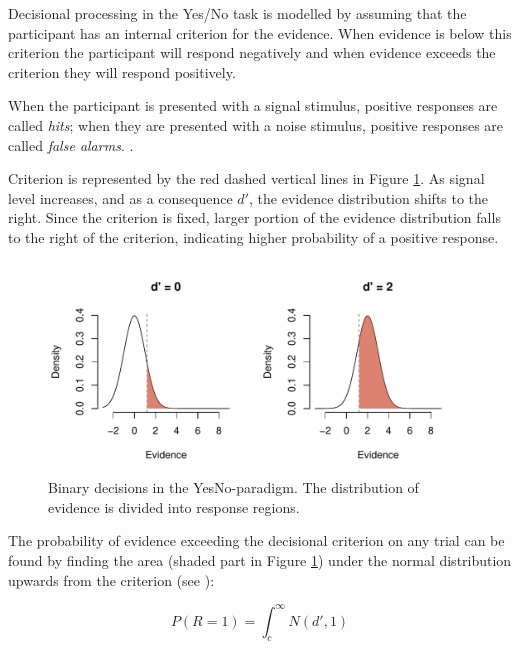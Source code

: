 \documentclass{article}\usepackage{knitr}
\begin{document}
Decisional processing in the Yes/No task is modelled by assuming that the participant has an internal criterion for the evidence. When evidence is below this criterion the participant will respond negatively and when evidence exceeds the criterion they will respond  positively.

When the participant is presented with a signal stimulus, positive responses are called \textit{hits}; when they  are presented with a noise stimulus, positive responses are called \textit{false alarms}. \citep{wickens2002, kingdomprins2010}. 

Criterion is represented by the red dashed vertical lines in Figure \ref{fig:yesno}. As signal level increases, and as a consequence $d'$, the evidence distribution shifts to the right. Since the criterion is fixed, larger portion of the evidence distribution falls to the right of the criterion, indicating higher probability of a positive response.

\begin{figure}[!htb]
\centering
\begin{knitrout}
\color{fgcolor}
\includegraphics[width=\maxwidth]{figure/unnamed-chunk-4-1} 

\end{knitrout}
\caption{Binary decisions in the YesNo-paradigm. The distribution of evidence is divided into response regions.}
\label{fig:yesno}
\end{figure}

The probability of evidence exceeding the decisional criterion on any trial can be found by finding the area (shaded part in Figure \ref{fig:yesno}) under the normal distribution upwards from the criterion (see \citet{wickens2002, kingdomprins2010}):

\begin{equation}
\label{eq:SDTintegral}
P(R = 1) = \int_{c}^{\infty} N(d', 1)
\end{equation}
\end{document}
